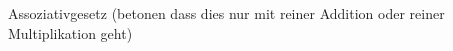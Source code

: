 \documentclass[../../main.tex]{subfiles}
\begin{document}
Assoziativgesetz (betonen dass dies nur mit reiner Addition oder reiner Multiplikation geht)
\end{document}

